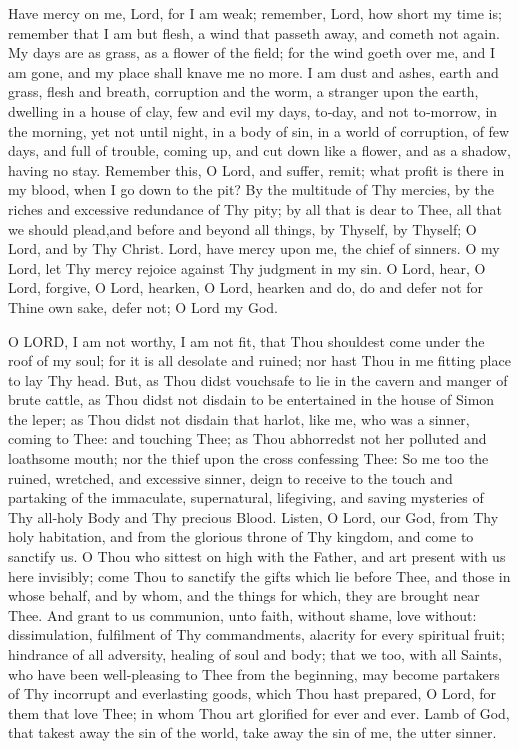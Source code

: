 
Have mercy on me, Lord, for I am weak; remember, Lord, how short my time is; remember that I am but flesh, a wind that passeth away, and cometh not again. My days are as grass, as a flower of the field; for the wind goeth over me, and I am gone, and my place shall knave me no more. I am dust and ashes, earth and grass, flesh and breath, corruption and the worm, a stranger upon the earth, dwelling in a house of clay, few and evil my days, to‑day, and not to‑morrow, in the morning, yet not until night, in a body of sin, in a world of corruption, of few days, and full of trouble, coming up, and cut down like a flower, and as a shadow, having no stay. Remember this, O Lord, and suffer, remit; what profit is there in my blood, when I go down to the pit? By the multitude of Thy mercies, by the riches and excessive redundance of Thy pity; by all that is dear to Thee, all that we should plead,and before and beyond all things, by Thyself, by Thyself; O Lord, and by Thy Christ. Lord, have mercy upon me, the chief of sinners. O my Lord, let Thy mercy rejoice against Thy judgment in my sin. O Lord, hear, O Lord, forgive, O Lord, hearken, O Lord, hearken and do, do and defer not for Thine own sake, defer not; O Lord my God.


O LORD, I am not worthy, I am not fit, that Thou shouldest come under the roof of my soul; for it is all desolate and ruined; nor hast Thou in me fitting place to lay Thy head. But, as Thou didst vouchsafe to lie in the cavern and manger of brute cattle, as Thou didst not disdain to be entertained in the house of Simon the leper; as Thou didst not disdain that harlot, like me, who was a sinner, coming to Thee: and touching Thee; as Thou abhorredst not her polluted and loathsome mouth; nor the thief upon the cross confessing Thee: So me too the ruined, wretched, and excessive sinner, deign to receive to the touch and partaking of the immaculate, supernatural, lifegiving, and saving mysteries of Thy all‑holy Body and Thy precious Blood. Listen, O Lord, our God, from Thy holy habitation, and from the glorious throne of Thy kingdom, and come to sanctify us. O Thou who sittest on high with the Father, and art present with us here invisibly; come Thou to sanctify the gifts which lie before Thee, and those in whose behalf, and by whom, and the things for which, they are brought near Thee. And grant to us communion, unto faith, without shame, love without: dissimulation, fulfilment of Thy commandments, alacrity for every spiritual fruit; hindrance of all adversity, healing of soul and body; that we too, with all Saints, who have been well‑pleasing to Thee from the beginning, may become partakers of Thy incorrupt and everlasting goods, which Thou hast prepared, O Lord, for them that love Thee; in whom Thou art glorified for ever and ever. Lamb of God, that takest away the sin of the world, take away the sin of me, the utter sinner.

